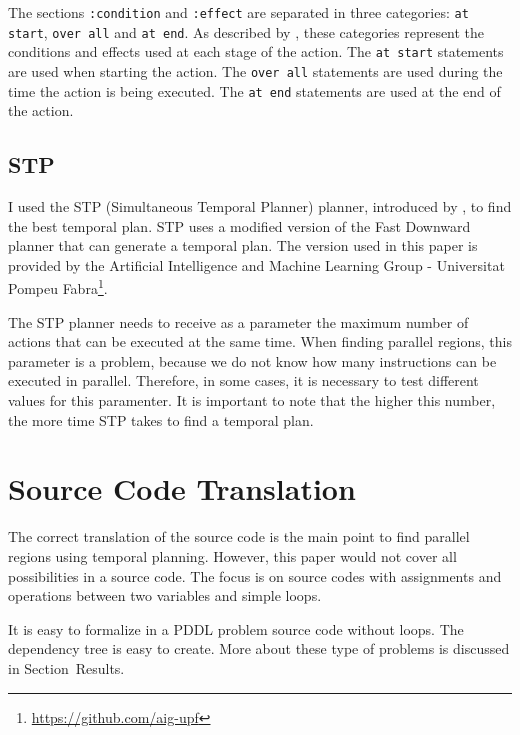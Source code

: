 \documentclass[letterpaper]{article}
\begin{document}
The sections \texttt{:condition} and \texttt{:effect} are separated in three categories: \texttt{at start}, \texttt{over all} and \texttt{at end}. As described by \cite{DBLP:series/synthesis/2019Haslum}, these categories represent the conditions and effects used at each stage of the action. The \texttt{at start} statements are used when starting the action. The \texttt{over all} statements are used during the time the action is being executed. The \texttt{at end} statements are used at the end of the action.



\subsection{STP}

I used the STP (Simultaneous Temporal Planner) planner, introduced by \cite{Blanco2018ForwardsearchTP}, to find the best temporal plan. STP uses a modified version of the Fast Downward \cite{Helmert_2006} planner that can generate a temporal plan. The version used in this paper is provided by the Artificial Intelligence and Machine Learning Group - Universitat Pompeu Fabra\footnote{\href{https://github.com/aig-upf}{https://github.com/aig-upf}}.

The STP planner needs to receive as a parameter the maximum number of actions that can be executed at the same time. When finding parallel regions, this parameter is a problem, because we do not know how many instructions can be executed in parallel. Therefore, in some cases, it is necessary to test different values for this paramenter. It is important to note that the higher this number, the more time STP takes to find a temporal plan.


\section{Source Code Translation}

The correct translation of the source code is the main point to find parallel regions using temporal planning. However, this paper would not cover all possibilities in a source code. The focus is on source codes with assignments and operations between two variables and simple loops.

It is easy to formalize in a PDDL problem source code without loops. The dependency tree is easy to create. More about these type of problems is discussed in Section~Results.
\end{document}

